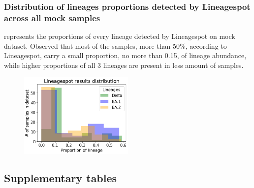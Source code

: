        \subsubsection{Distribution of lineages proportions detected by Lineagespot across all mock samples}  
         represents the proportions of every lineage detected by Lineagespot on mock dataset. Observed that most of the samples, more than 50\%, according to Lineagespot, carry a small proportion, no more than 0.15, of lineage abundance, while higher proportions of all 3 lineages are present in less amount of samples.
        \begin{figure}[ht!]
        	\centering
            \includegraphics[width=0.5\textwidth]{figures/further/distr-lineagespot.png}
            \label{fig:further:dist-ls}
        \end{figure}
        
    \subsection{Supplementary tables}
